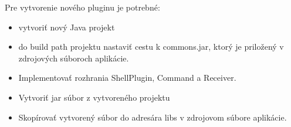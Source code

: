 Pre vytvorenie nového pluginu je potrebné:
\begin{itemize}
	\item vytvoriť nový Java projekt
	\item do build path projektu nastaviť cestu k commons.jar, ktorý je priložený v zdrojových súboroch aplikácie.
	\item Implementovať rozhrania ShellPlugin, Command a Receiver.
	\item Vytvoriť \acrshort{jar} súbor z vytvoreného projektu
	\item Skopírovať vytvorený súbor do adresára libs v zdrojovom súbore aplikácie.
\end{itemize}
